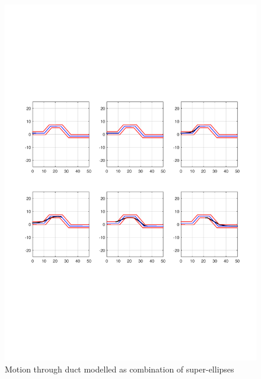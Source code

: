 \documentclass[11pt,a4paper]{article}
\begin{document}
\begin{figure}[h]
\centering
\includegraphics[scale=0.5]{figures/fig5.pdf}
\caption{ Motion through duct modelled as combination of super-ellipses\label{fig:ductasSEs}}
\end{figure}
\end{document}
